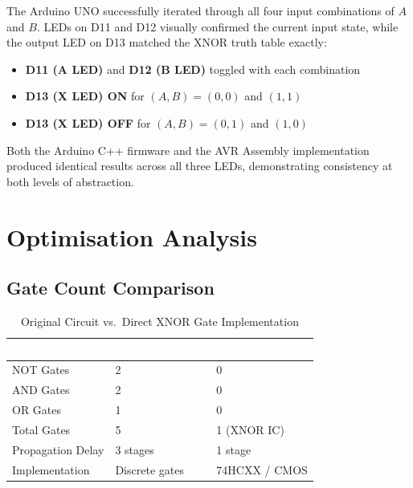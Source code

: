\documentclass[12pt,a4paper]{article}
\begin{document}
\begin{tcolorbox}[abstractbox, title={Experimental Findings}]
The Arduino UNO successfully iterated through all four input combinations of
$A$ and $B$. LEDs on D11 and D12 visually confirmed the current input state,
while the output LED on D13 matched the XNOR truth table exactly:
\begin{itemize}[itemsep=2pt]
    \item \textbf{D11 (A LED)} and \textbf{D12 (B LED)} toggled with each combination \quad
          \textcolor{checkgreen}{\checkmark}
    \item \textbf{D13 (X LED) ON}  for $(A,B) = (0,0)$ and $(1,1)$ \quad
          \textcolor{checkgreen}{\checkmark}
    \item \textbf{D13 (X LED) OFF} for $(A,B) = (0,1)$ and $(1,0)$ \quad
          \textcolor{checkgreen}{\checkmark}
\end{itemize}
Both the Arduino C++ firmware and the AVR Assembly implementation produced
identical results across all three LEDs, demonstrating consistency at both
levels of abstraction.
\end{tcolorbox}

\section{Optimisation Analysis}

\subsection{Gate Count Comparison}

\begin{table}[H]
\centering
\caption{Original Circuit vs.\ Direct XNOR Gate Implementation}
\renewcommand{\arraystretch}{1.4}
\begin{tabular}{L{5.5cm} C{3cm} C{3cm}}
\toprule
{}
\textcolor{white}{\textbf{Metric}} &
\textcolor{white}{\textbf{Original Circuit}} &
\textcolor{white}{\textbf{Simplified}} \\
\midrule
NOT Gates            & 2 & 0 \\
AND Gates            & 2 & 0 \\
OR Gates             & 1 & 0 \\
Total Gates          & 5 & 1 (XNOR IC) \\
Propagation Delay    & 3 stages & 1 stage \\
Implementation       & Discrete gates & 74HCXX / CMOS \\
\bottomrule
\end{tabular}
\end{table}
\end{document}
